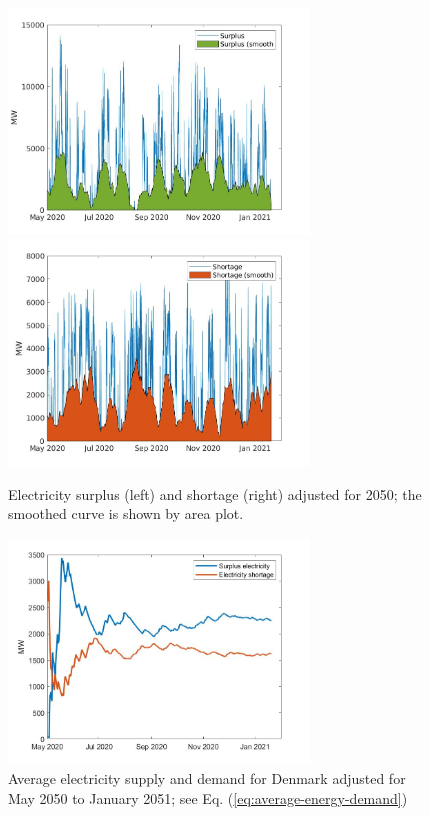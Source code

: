 \documentclass{ECOS_2021}
\begin{document}
\begin{figure}[H]
\includegraphics[width=8cm]{smoothed_surplus}\includegraphics[width=8cm]{smoothed_deficit}

\caption{\label{fig:Electricity-surplus-smooth}Electricity surplus (left)
and shortage (right) adjusted for 2050; the smoothed curve is shown
by area plot.}
\end{figure}

\begin{figure}[H]
\includegraphics[width=8cm]{supply_demand_six_month_dk}

\caption{\label{fig:Average-electricity-supply}Average electricity supply
and demand for Denmark adjusted for May 2050 to January 2051; see
Eq. (\ref{eq:average-energy-demand})}
\end{figure}
\end{document}
